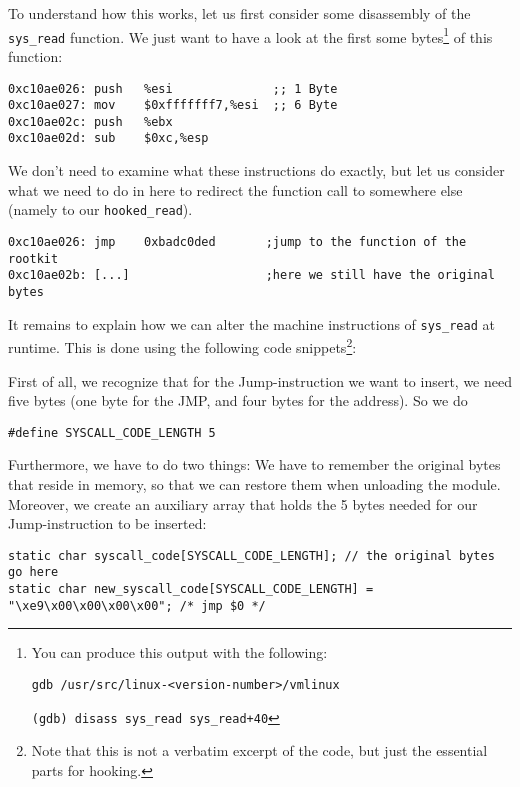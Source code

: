 \documentclass[10pt, letterpaper]{scrartcl}
\begin{document}
To understand how this works, let us first consider some disassembly of the \texttt{sys\_read} function. We just want to have a look at the first some bytes\footnote{You can produce this output with the following:

\texttt{gdb /usr/src/linux-<version-number>/vmlinux}

\texttt{(gdb) disass sys\_read\ sys\_read+40}} of this function:

\begin{verbatim}
0xc10ae026:	push   %esi              ;; 1 Byte
0xc10ae027:	mov    $0xfffffff7,%esi  ;; 6 Byte
0xc10ae02c:	push   %ebx              
0xc10ae02d:	sub    $0xc,%esp
\end{verbatim}

We don't need to examine what these instructions do exactly, but let us consider what we need to do in here to redirect the function call to somewhere else (namely to our \texttt{hooked\_read}).

\begin{verbatim}
0xc10ae026:	jmp    0xbadc0ded       ;jump to the function of the rootkit
0xc10ae02b:	[...]                   ;here we still have the original bytes
\end{verbatim}

It remains to explain how we can alter the machine instructions of \texttt{sys\_read} at runtime. This is done using the following code snippets\footnote{Note that this is not a verbatim excerpt of the code, but just the essential parts for hooking.}:

First of all, we recognize that for the Jump-instruction we want to insert, we need five bytes (one byte for the JMP, and four bytes for the address). So we do

\begin{verbatim}
#define SYSCALL_CODE_LENGTH 5
\end{verbatim}

Furthermore, we have to do two things: We have to remember the original bytes that reside in memory, so that we can restore them when unloading the module. Moreover, we create an auxiliary array that holds the 5 bytes needed for our Jump-instruction to be inserted:

\begin{verbatim}
static char syscall_code[SYSCALL_CODE_LENGTH]; // the original bytes go here
static char new_syscall_code[SYSCALL_CODE_LENGTH] = "\xe9\x00\x00\x00\x00"; /* jmp $0 */
\end{verbatim}
\end{document}
